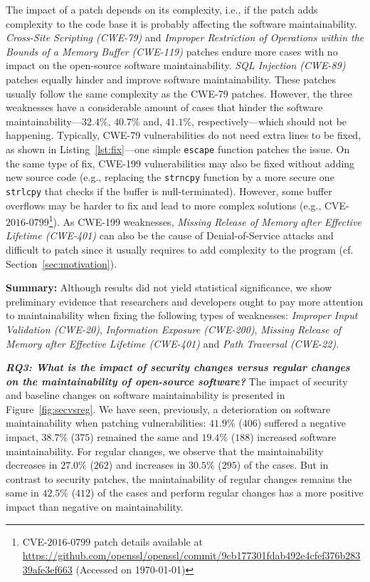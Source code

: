 \documentclass[smallextended]{svjour3}       %
\begin{document}
The impact of a patch depends on its complexity, i.e., if the patch
adds complexity to the code base it is probably affecting the software
maintainability. \emph{Cross-Site Scripting (CWE-79)} and 
\emph{Improper Restriction of Operations within the Bounds of 
a Memory Buffer (CWE-119)} patches endure more
cases with no impact on the open-source software maintainability. \emph{SQL Injection
(CWE-89)} patches equally hinder and improve software maintainability.
These patches usually follow the same complexity as the CWE-79 patches.
However, the three weaknesses have a considerable amount of cases that hinder
the software maintainability---$32.4\%$, $40.7\%$ and, $41.1\%$, respectively---which
should not be happening. Typically, CWE-79 vulnerabilities do not need extra lines 
to be fixed, as shown in Listing~\ref{lst:fix}---one simple 
\texttt{escape} function patches the issue. On the same type of fix,
CWE-199 vulnerabilities may also be fixed without adding new source code
(e.g., replacing the \texttt{strncpy} function by a more secure one 
\texttt{strlcpy} that checks if the buffer is null-terminated). However,
some buffer overflows may be harder to fix and lead to more complex 
solutions (e.g., 
CVE-$2016$-$0799$\footnote{CVE-$2016$-$0799$ patch details available at 
\url{https://github.com/openssl/openssl/commit/9cb177301fdab492e4cfef376b28339afe3ef663}
(Accessed on \today{})}). 
As CWE-199 weaknesses, \emph{Missing Release of Memory after Effective 
Lifetime (CWE-401)} can also be the cause of Denial-of-Service attacks and  
difficult to patch since it usually requires to add complexity to the program (cf. Section~\ref{sec:motivation}). 


\textbf{Summary:}
Although results did not yield statistical significance, we show preliminary evidence that researchers and developers ought to pay more attention to maintainability when fixing the following types of weaknesses: \emph{Improper Input Validation (CWE-20)}, \emph{Information Exposure
(CWE-200)}, \emph{Missing Release of Memory after Effective
Lifetime (CWE-401)} and \emph{Path Traversal (CWE-22)}.

%

\textit{\textbf{RQ3: What is the impact of security changes versus regular 
changes on the maintainability of open-source software?}}
The impact of security and baseline changes on software maintainability 
is presented in Figure~\ref{fig:secvsreg}.  
We have seen, previously, a deterioration on software maintainability 
when patching vulnerabilities: $41.9\%$ ($406$) suffered a 
negative impact, $38.7\%$ ($375$) remained the same and $19.4\%$ 
($188$) increased software maintainability. For regular changes, 
we observe that the maintainability decreases in $27.0\%$ ($262$) 
and increases in $30.5\%$ ($295$) of the cases. But in contrast to 
security patches, the maintainability of regular changes remains the 
same in $42.5\%$ ($412$) of the cases and perform regular
changes has a more positive impact than negative on  
maintainability. 
\end{document}
